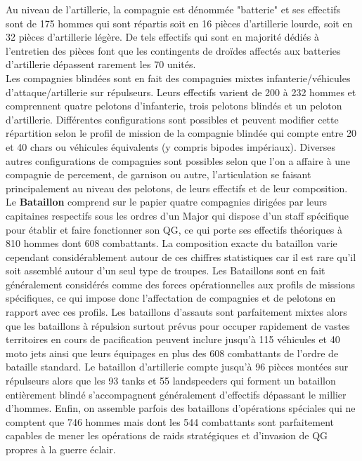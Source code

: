 \documentclass[twoside]{article}
\begin{document}
Au niveau de l'artillerie, la compagnie est dénommée "batterie" et ses effectifs sont de 175 hommes qui sont répartis soit en 16 pièces d'artillerie lourde, soit en 32 pièces d'artillerie légère. De tels effectifs qui sont en majorité dédiés à l'entretien des pièces font que les contingents de droïdes affectés aux batteries d'artillerie dépassent rarement les 70 unités.\\

Les compagnies blindées sont en fait des compagnies mixtes infanterie/véhicules d'attaque/artillerie sur répulseurs. Leurs effectifs varient de 200 à 232 hommes et comprennent quatre pelotons d'infanterie, trois pelotons blindés et un peloton d'artillerie. Différentes configurations sont possibles et peuvent modifier cette répartition selon le profil de mission de la compagnie blindée qui compte entre 20 et 40 chars ou véhicules équivalents (y compris bipodes impériaux).
Diverses autres configurations de compagnies sont possibles selon que l'on a affaire à une compagnie de percement, de garnison ou autre, l'articulation se faisant principalement au niveau des pelotons, de leurs effectifs et de leur composition.\\

Le \textbf{Bataillon} comprend sur le papier quatre compagnies dirigées par leurs capitaines respectifs sous les ordres d'un Major qui dispose d'un staff spécifique pour établir et faire fonctionner son QG, ce qui porte ses effectifs théoriques à 810 hommes dont 608 combattants. La composition exacte du bataillon varie cependant considérablement autour de ces chiffres statistiques car il est rare qu'il soit assemblé autour d'un seul type de troupes. Les Bataillons sont en fait généralement considérés comme des forces opérationnelles aux profils de missions spécifiques, ce qui impose donc l'affectation de compagnies et de pelotons en rapport avec ces profils. Les bataillons d'assauts sont parfaitement mixtes alors que les bataillons à répulsion surtout prévus pour occuper rapidement de vastes territoires en cours de pacification peuvent inclure jusqu'à 115 véhicules et 40 moto jets ainsi que leurs équipages en plus des 608 combattants de l'ordre de bataille standard. Le bataillon d'artillerie compte jusqu'à 96 pièces montées sur répulseurs alors que les 93 tanks et 55 landspeeders qui forment un bataillon entièrement blindé s'accompagnent généralement d'effectifs dépassant le millier d'hommes. Enfin, on assemble parfois des bataillons d'opérations spéciales qui ne comptent que 746 hommes mais dont les 544 combattants sont parfaitement capables de mener les opérations de raids stratégiques et d'invasion de QG propres à la guerre éclair.\\
\end{document}
